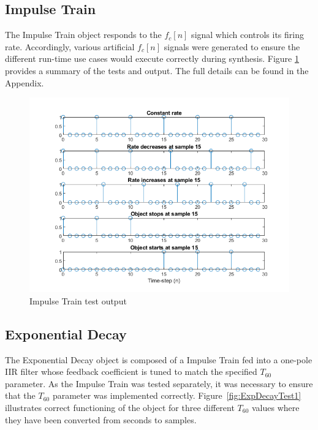 \documentclass[../main.tex]{subfiles}
\begin{document}
\subsection{Impulse Train}
The Impulse Train object responds to the $f_c[n]$ signal which controls its firing rate. Accordingly, various artificial $f_c[n]$ signals were generated to ensure the different run-time use cases would execute correctly during synthesis. Figure \ref{fig:ImpulseTrainTest} provides a summary of the tests and output. The full details can be found in the Appendix. 

\begin{figure}[h]
    \centering
    \includegraphics[scale=.65]{./images/plots/ImpulseTrainTest.png}
    \caption{Impulse Train test output}
    \label{fig:ImpulseTrainTest}
\end{figure}

\subsection{Exponential Decay}
The Exponential Decay object is composed of a Impulse Train fed into a one-pole IIR filter whose feedback coefficient is tuned to match the specified $T_{60}$ parameter. As the Impulse Train was tested separately, it was necessary to ensure that the $T_{60}$ parameter was implemented correctly. Figure~\ref{fig:ExpDecayTest1} illustrates correct functioning of the object for three different $T_{60}$ values where they have been converted from seconds to samples. 
\end{document}

